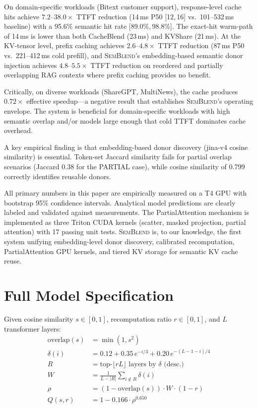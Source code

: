 \documentclass[11pt,twocolumn]{article}
\newcommand{\semblend}{\textsc{SemBlend}\xspace}
\newcommand{\ci}[2]{\scriptsize{[#1,\,#2]}}
\begin{document}
On domain-specific workloads (Bitext customer support), response-level
cache hits achieve $7.2\text{--}38.0\times$ TTFT reduction (14\,ms P50
\ci{12}{16} vs.\ 101--532\,ms baseline) with a 95.6\% semantic hit rate
\ci{89.0\%}{98.8\%}. The exact-hit warm-path of 14\,ms is lower than
both CacheBlend (23\,ms) and KVShare (21\,ms). At the KV-tensor level,
prefix caching achieves $2.6\text{--}4.8\times$ TTFT reduction (87\,ms
P50 vs.\ 221--412\,ms cold prefill), and \semblend's embedding-based
semantic donor injection achieves $\mathbf{4.8\text{--}5.5\times}$
TTFT reduction on reordered and partially overlapping RAG contexts
where prefix caching provides no benefit.

Critically, on diverse workloads (ShareGPT, MultiNews), the cache
produces $0.72\times$ effective speedup---a negative result that
establishes \semblend's operating envelope. The system is beneficial
for domain-specific workloads with high semantic overlap and/or models
large enough that cold TTFT dominates cache overhead.

A key empirical finding is that embedding-based donor discovery
(jina-v4 cosine similarity) is essential. Token-set Jaccard similarity
fails for partial overlap scenarios (Jaccard 0.38 for the PARTIAL
case), while cosine similarity of 0.799 correctly identifies reusable
donors.

All primary numbers in this paper are empirically measured on a T4 GPU
with bootstrap 95\% confidence intervals. Analytical model predictions
are clearly labeled and validated against measurements. The
PartialAttention mechanism is implemented as three Triton CUDA kernels
(scatter, masked projection, partial attention) with 17 passing unit
tests. \semblend is, to our knowledge, the first system unifying
embedding-level donor discovery, calibrated recomputation,
PartialAttention GPU kernels, and tiered KV storage for semantic KV
cache reuse.


\appendix
\section{Full Model Specification}
\label{app:model}

Given cosine similarity $s \in [0,1]$, recomputation ratio $r \in [0,1]$,
and $L$ transformer layers:
\begin{align}
  \text{overlap}(s) &= \min(1, s^2) \\
  \delta(i) &= 0.12 + 0.35\,e^{-i/3} + 0.20\,e^{-(L-1-i)/4} \\
  R &= \text{top-}\lfloor rL \rfloor \text{ layers by } \delta \text{ (desc.)} \\
  W &= \frac{1}{L - |R|} \sum_{i \notin R} \delta(i) \\
  \rho &= (1 - \text{overlap}(s)) \cdot W \cdot (1-r) \\
  Q(s,r) &= 1 - 0.166 \cdot \rho^{0.650}
\end{align}
\end{document}
